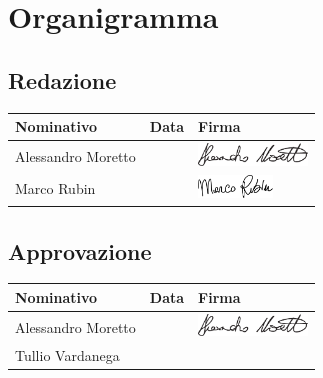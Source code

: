 \section{Organigramma}
	
\subsection{Redazione}
\begin{center}
	\begin{tabu} to \textwidth {|X[4]|X[2c]|X[5]|}
	\hline
     Nominativo & Data & Firma \\ \hline
     Alessandro Moretto & & \includegraphics[height=6mm]{Commons/Pics/Signatures/Moretto.pdf}\\ \hline
     Marco Rubin & &\includegraphics[height=6mm]{Commons/Pics/Signatures/Rubin.pdf} \\ \hline
     \end{tabu}
	\end{center}
\subsection{Approvazione}
	\begin{center}
	\begin{tabu} to \textwidth {|X[4]|X[2c]|X[5]|}
	\hline
     Nominativo & Data & Firma \\ \hline
     Alessandro Moretto & & \includegraphics[height=6mm]{Commons/Pics/Signatures/Moretto.pdf}\\ \hline
     Tullio Vardanega & & \parbox[b]{1cm}{\vspace{6mm}}\\ \hline
     \end{tabu}
	\end{center}
